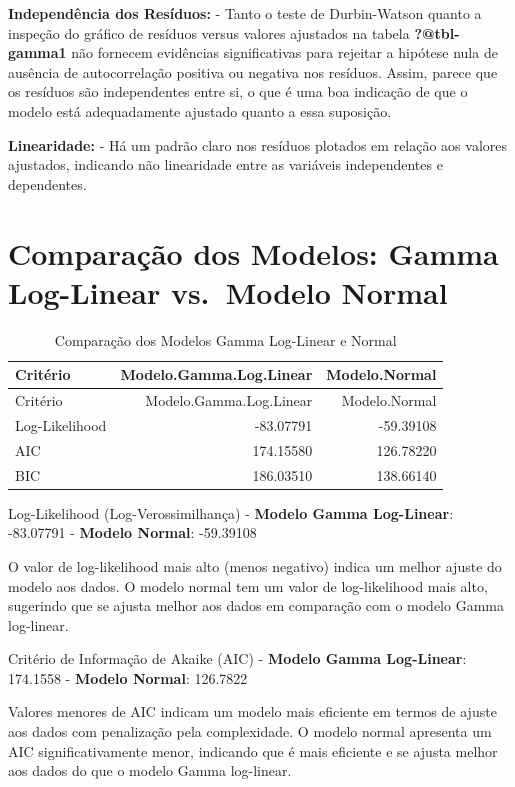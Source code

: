 \documentclass[
  letterpaper,
  DIV=11,
  numbers=noendperiod]{scrreprt}
\begin{document}
\textbf{Independência dos Resíduos:} - Tanto o teste de Durbin-Watson
quanto a inspeção do gráfico de resíduos versus valores ajustados na
tabela \textbf{?@tbl-gamma1} não fornecem evidências significativas para
rejeitar a hipótese nula de ausência de autocorrelação positiva ou
negativa nos resíduos. Assim, parece que os resíduos são independentes
entre si, o que é uma boa indicação de que o modelo está adequadamente
ajustado quanto a essa suposição.

\textbf{Linearidade:} - Há um padrão claro nos resíduos plotados em
relação aos valores ajustados, indicando não linearidade entre as
variáveis independentes e dependentes.

\section{Comparação dos Modelos: Gamma Log-Linear vs.~Modelo
Normal}\label{comparauxe7uxe3o-dos-modelos-gamma-log-linear-vs.-modelo-normal}

\begin{longtable}[]{@{}lrr@{}}
\caption{Comparação dos Modelos Gamma Log-Linear e
Normal}\tabularnewline
\toprule\noalign{}
Critério & Modelo.Gamma.Log.Linear & Modelo.Normal \\
\midrule\noalign{}
\endfirsthead
\toprule\noalign{}
Critério & Modelo.Gamma.Log.Linear & Modelo.Normal \\
\midrule\noalign{}
\endhead
\bottomrule\noalign{}
\endlastfoot
Log-Likelihood & -83.07791 & -59.39108 \\
AIC & 174.15580 & 126.78220 \\
BIC & 186.03510 & 138.66140 \\
\end{longtable}

Log-Likelihood (Log-Verossimilhança) - \textbf{Modelo Gamma Log-Linear}:
-83.07791 - \textbf{Modelo Normal}: -59.39108

O valor de log-likelihood mais alto (menos negativo) indica um melhor
ajuste do modelo aos dados. O modelo normal tem um valor de
log-likelihood mais alto, sugerindo que se ajusta melhor aos dados em
comparação com o modelo Gamma log-linear.

Critério de Informação de Akaike (AIC) - \textbf{Modelo Gamma
Log-Linear}: 174.1558 - \textbf{Modelo Normal}: 126.7822

Valores menores de AIC indicam um modelo mais eficiente em termos de
ajuste aos dados com penalização pela complexidade. O modelo normal
apresenta um AIC significativamente menor, indicando que é mais
eficiente e se ajusta melhor aos dados do que o modelo Gamma log-linear.
\end{document}
